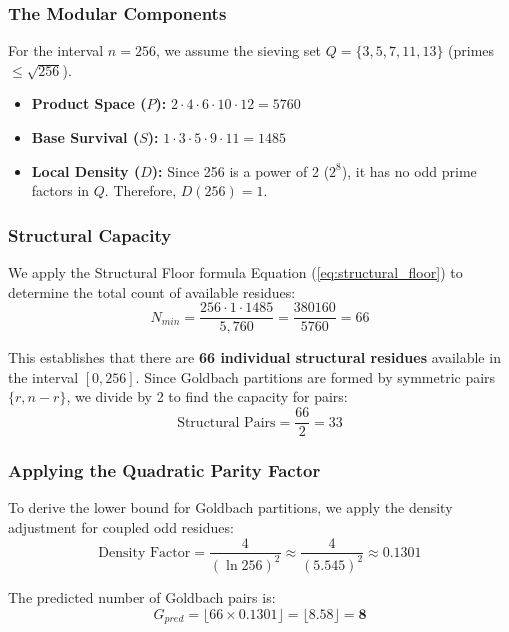 \documentclass[twoside,9pt]{extarticle}
\begin{document}
\subsubsection*{The Modular Components}

For the interval $n=256$, we assume the sieving set $Q = \{3, 5, 7, 11, 13\}$ (primes $\le \sqrt{256}$).
\begin{itemize}
    \item \textbf{Product Space ($P$):} $2 \cdot 4 \cdot 6 \cdot 10 \cdot 12 = 5760$
    \item \textbf{Base Survival ($S$):} $1 \cdot 3 \cdot 5 \cdot 9 \cdot 11 = 1485$
    \item \textbf{Local Density ($D$):} Since 256 is a power of 2 ($2^8$), it has no odd prime factors in $Q$. Therefore, $D(256) = 1$.
\end{itemize}

\subsubsection*{Structural Capacity}

We apply the Structural Floor formula Equation (\ref{eq:structural_floor}) to determine the total count of available residues:
\begin{equation}
N_{min} = \frac{256 \cdot 1 \cdot 1485}{5,760} = \frac{380160}{5760} = 66
\end{equation}

This establishes that there are \textbf{66 individual structural residues} available in the interval $[0, 256]$. Since Goldbach partitions are formed by symmetric pairs $\{r, n-r\}$, we divide by 2 to find the capacity for pairs:
\begin{equation}
\text{Structural Pairs} = \frac{66}{2} = 33
\end{equation}

\subsubsection*{Applying the Quadratic Parity Factor}

To derive the lower bound for Goldbach partitions, we apply the density adjustment for coupled odd residues:
\begin{equation}
\text{Density Factor} = \frac{4}{(\ln 256)^2} \approx \frac{4}{(5.545)^2} \approx 0.1301
\end{equation}

The predicted number of Goldbach pairs is: 
\begin{equation}
G_{pred} = \lfloor 66 \times 0.1301 \rfloor = \lfloor 8.58 \rfloor = \textbf{8}
\end{equation}
\end{document}
